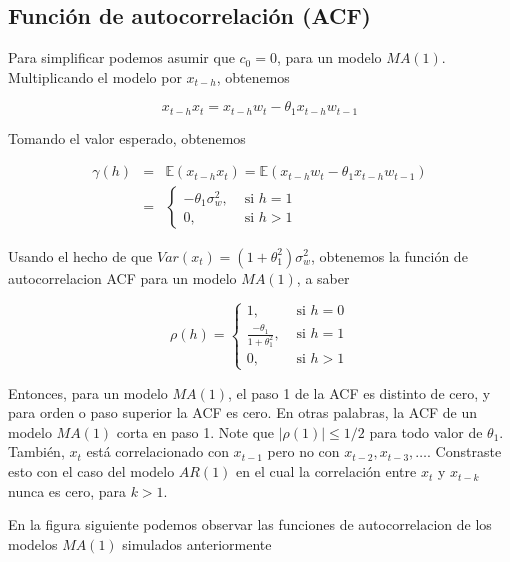 \documentclass[12pt,]{krantz}
\theoremstyle{definition}
\theoremstyle{definition}
\theoremstyle{definition}
\theoremstyle{remark}
\begin{document}
\subsection{Función de autocorrelación
(ACF)}\label{funcion-de-autocorrelacion-acf}

Para simplificar podemos asumir que \(c_0=0\), para un modelo \(MA(1)\).
Multiplicando el modelo por \(x_{t-h}\), obtenemos

\[x_{t-h}x_t=x_{t-h}w_t-\theta_1x_{t-h}w_{t-1}\]

Tomando el valor esperado, obtenemos

\begin{eqnarray}
\gamma(h) &=& \mathbb{E}(x_{t-h}x_t) = \mathbb{E}(x_{t-h}w_t-\theta_1x_{t-h}w_{t-1}) \nonumber \\
    &=& \begin{cases}
          -\theta_1\sigma_w^2,&\text{ si }h=1 \\
          0, &\text{ si }h>1
        \end{cases}
\label{eq:eq-autocovarianza-MA1}
\end{eqnarray}

Usando el hecho de que \(Var(x_t)=(1+\theta_1^2)\sigma_w^2\), obtenemos
la función de autocorrelacion ACF para un modelo \(MA(1)\), a saber

\begin{equation}
\rho(h) = \begin{cases}
            1,&\text{ si }h=0 \\
            \frac{-\theta_1}{1+\theta_1^2},&\text{ si }h=1 \\
            0,&\text{ si }h>1
          \end{cases}
\label{eq:eq-ACF-MA1}
\end{equation}

Entonces, para un modelo \(MA(1)\), el paso 1 de la ACF es distinto de
cero, y para orden o paso superior la ACF es cero. En otras palabras, la
ACF de un modelo \(MA(1)\) corta en paso 1. Note que
\(|\rho(1)|\leq1/2\) para todo valor de \(\theta_1\). También, \(x_t\)
está correlacionado con \(x_{t-1}\) pero no con
\(x_{t-2},x_{t-3},\ldots\). Constraste esto con el caso del modelo
\(AR(1)\) en el cual la correlación entre \(x_t\) y \(x_{t-k}\) nunca es
cero, para \(k>1\).

En la figura siguiente podemos observar las funciones de autocorrelacion
de los modelos \(MA(1)\) simulados anteriormente
\end{document}
